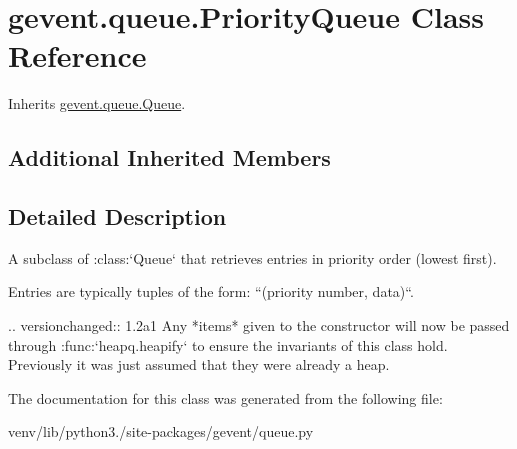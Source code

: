 \hypertarget{classgevent_1_1queue_1_1_priority_queue}{}\section{gevent.\+queue.\+Priority\+Queue Class Reference}
\label{classgevent_1_1queue_1_1_priority_queue}


Inherits \hyperlink{classgevent_1_1queue_1_1_queue}{gevent.\+queue.\+Queue}.

\subsection*{Additional Inherited Members}


\subsection{Detailed Description}
\begin{DoxyVerb}A subclass of :class:`Queue` that retrieves entries in priority order (lowest first).

Entries are typically tuples of the form: ``(priority number, data)``.

.. versionchanged:: 1.2a1
   Any *items* given to the constructor will now be passed through
   :func:`heapq.heapify` to ensure the invariants of this class hold.
   Previously it was just assumed that they were already a heap.
\end{DoxyVerb}
 

The documentation for this class was generated from the following file\+:\begin{DoxyCompactItemize}
\item 
venv/lib/python3./site-\/packages/gevent/queue.\+py\end{DoxyCompactItemize}
